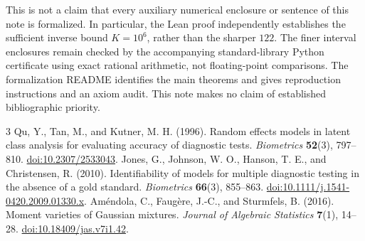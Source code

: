 \documentclass[11pt,a4paper]{article}
\numberwithin{equation}{section}
\begin{document}
This is not a claim that every auxiliary numerical enclosure or sentence of this note is formalized. In particular, the Lean proof independently establishes the sufficient inverse bound $K=10^6$, rather than the sharper $122$. The finer interval enclosures remain checked by the accompanying standard-library Python certificate using exact rational arithmetic, not floating-point comparisons. The formalization README identifies the main theorems and gives reproduction instructions and an axiom audit. This note makes no claim of established bibliographic priority.

\begin{thebibliography}{3}
 Qu, Y., Tan, M., and Kutner, M. H. (1996).
Random effects models in latent class analysis for evaluating accuracy of diagnostic tests.
\emph{Biometrics} \textbf{52}(3), 797--810.
\href{https://doi.org/10.2307/2533043}{doi:10.2307/2533043}.
 Jones, G., Johnson, W. O., Hanson, T. E., and Christensen, R. (2010).
Identifiability of models for multiple diagnostic testing in the absence of a gold standard.
\emph{Biometrics} \textbf{66}(3), 855--863.
\href{https://doi.org/10.1111/j.1541-0420.2009.01330.x}{doi:10.1111/j.1541-0420.2009.01330.x}.
 Am\'endola, C., Faug\`ere, J.-C., and Sturmfels, B. (2016).
Moment varieties of Gaussian mixtures.
\emph{Journal of Algebraic Statistics} \textbf{7}(1), 14--28.
\href{https://doi.org/10.18409/jas.v7i1.42}{doi:10.18409/jas.v7i1.42}.
\end{thebibliography}
\end{document}

